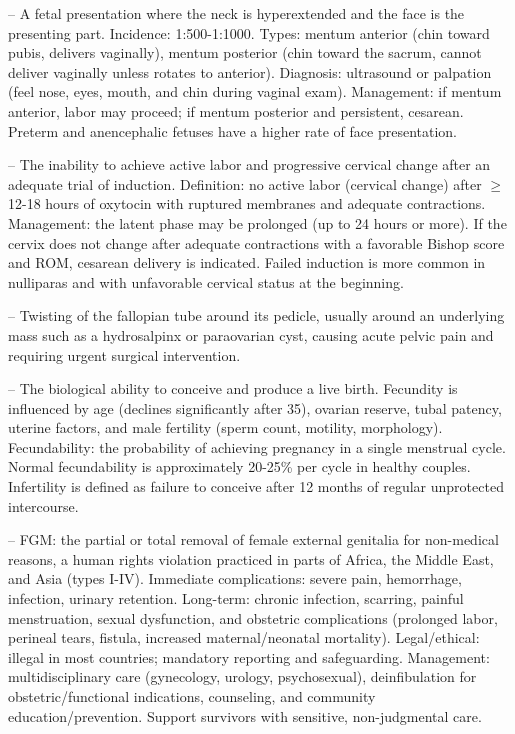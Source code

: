 -- A fetal presentation where the neck is hyperextended and the face is the presenting part. Incidence: 1:500-1:1000. Types: mentum anterior (chin toward pubis, delivers vaginally), mentum posterior (chin toward the sacrum, cannot deliver vaginally unless rotates to anterior). Diagnosis: ultrasound or palpation (feel nose, eyes, mouth, and chin during vaginal exam). Management: if mentum anterior, labor may proceed; if mentum posterior and persistent, cesarean. Preterm and anencephalic fetuses have a higher rate of face presentation.

-- The inability to achieve active labor and progressive cervical change after an adequate trial of induction. Definition: no active labor (cervical change) after \(\ge\)12-18 hours of oxytocin with ruptured membranes and adequate contractions. Management: the latent phase may be prolonged (up to 24 hours or more). If the cervix does not change after adequate contractions with a favorable Bishop score and ROM, cesarean delivery is indicated. Failed induction is more common in nulliparas and with unfavorable cervical status at the beginning.

-- Twisting of the fallopian tube around its pedicle, usually around an underlying mass such as a hydrosalpinx or paraovarian cyst, causing acute pelvic pain and requiring urgent surgical intervention.

-- The biological ability to conceive and produce a live birth. Fecundity is influenced by age (declines significantly after 35), ovarian reserve, tubal patency, uterine factors, and male fertility (sperm count, motility, morphology). Fecundability: the probability of achieving pregnancy in a single menstrual cycle. Normal fecundability is approximately 20-25\% per cycle in healthy couples. Infertility is defined as failure to conceive after 12 months of regular unprotected intercourse.

-- FGM: the partial or total removal of female external genitalia for non-medical reasons, a human rights violation practiced in parts of Africa, the Middle East, and Asia (types I-IV). Immediate complications: severe pain, hemorrhage, infection, urinary retention. Long-term: chronic infection, scarring, painful menstruation, sexual dysfunction, and obstetric complications (prolonged labor, perineal tears, fistula, increased maternal/neonatal mortality). Legal/ethical: illegal in most countries; mandatory reporting and safeguarding. Management: multidisciplinary care (gynecology, urology, psychosexual), deinfibulation for obstetric/functional indications, counseling, and community education/prevention. Support survivors with sensitive, non-judgmental care.

